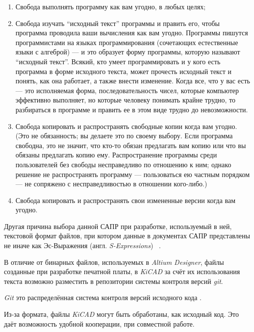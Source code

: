 \begin{enumerate}
\item Свобода выполнять программу как вам угодно, в любых целях;
  
\item Свобода изучать “исходный текст” программы и править его, чтобы
программа проводила ваши вычисления как вам угодно. Программы пишутся
программистами на языках программирования (сочетающих естественные
языки с алгеброй) — и это образует форму программы, которую называют
“исходный текст”. Всякий, кто умеет программировать и у кого есть
программа в форме исходного текста, может прочесть исходный текст и
понять, как она работает, а также внести изменение. Когда все, что у
вас есть — это исполняемая форма, последовательность чисел, которые
компьютер эффективно выполняет, но которые человеку понимать крайне
трудно, то разбираться в программе и править ее в этом виде трудно до
невозможности.

\item  Свобода копировать и распространять свободные копии когда вам
угодно. (Это не обязанность; вы делаете это по своему выбору. Если
программа свободна, это не значит, что кто-то обязан предлагать вам
копию или что вы обязаны предлагать копию ему. Распространение
программы среди пользователей без свободы несправедливо по отношению к
ним; однако решение не распространять программу — пользоваться ею
частным порядком — не сопряжено с несправедливостью в отношении
кого-либо.)

\item Свобода копировать и распространять свои измененные версии когда
вам угодно.
\end{enumerate}

Другая причина выбора данной САПР при разработке,
используемый в ней, текстовой формат файлов,
при котором данные в документах САПР представлены
не иначе как Эс-Выражения (англ. \textit{S-Expressions})
~\cite{kicad-sexpr}.

В отличие от бинарных файлов,
используемых в \textit{Altium Designer},
файлы созданные при разработке печатной платы,
в \textit{KiCAD} за счёт их использования текста
возможно разместить в репозитории системы контроля версий
\textit{git}.

\textit{Git} это распределённая система контроля версий 
исходного кода \cite{git-dvcs}.

Из-за формата, файлы \textit{KiCAD} могут быть обработаны, как
исходный код.
Это даёт возможность удобной кооперации, при совместной работе.

